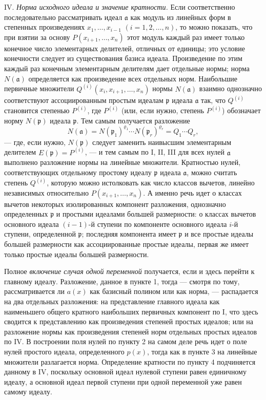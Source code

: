 \documentclass[11pt]{article}
\providecommand{\fraka}{\mathfrak a}
\providecommand{\frakp}{\mathfrak p}
\begin{document}
\noindent IV. \emph{Норма исходного идеала и значение кратности.} Если соответственно последовательно рассматривать идеал $\fraka$ как модуль из линейных форм в степенных произведениях $x_1,\ldots,x_{i-1}$ $(i=1,2,\ldots,n)$, то можно показать, что при взятии за основу $P(x_{i+1},\ldots,x_n)$ этот модуль каждый раз имеет только конечное число элементарных делителей, отличных от единицы; это условие конечности следует из существования базиса идеала. Произведение по этим каждый раз конечным элементарным делителям дает отдельные нормы; норма $N(\fraka)$ определяется как произведение всех отдельных норм. Наибольшие первичные множители $Q^{(i)}(x_i,x_{i+1},\ldots,x_n)$ нормы $N(\fraka)$ взаимно однозначно соответствуют ассоциированным простым идеалам $\frakp$ идеала $\fraka$ так, что $Q^{(i)}$ становится степенью $P^{(i)}$, где $P^{(i)}$ (или, если нужно, степень $P^{(i)}$) обозначает норму $N(\frakp)$ идеала $\frakp$. Тем самым получается разложение
\[
 N(\fraka)=N(\frakp_1)^{\varrho_1}\cdots N(\frakp_r)^{\varrho_r}=Q_1\cdots Q_r,
\]
--- где, если нужно, $N(\frakp)$ следует заменить наивысшим элементарным делителем $E(\frakp)=P^{(i)}$, --- и тем самым по I, II, III для всех нулей $\fraka$ выполнено разложение нормы на линейные множители. Кратностью нулей, соответствующих отдельному простому идеалу $\frakp$ идеала $\fraka$, можно считать степень $Q^{(i)}$, которую можно истолковать как число классов вычетов, линейно независимых относительно $P(x_{i+1},\ldots,x_n)$. А именно речь идет о классах вычетов некоторых изолированных компонент разложения, однозначно определенных $\frakp$ и простыми идеалами большей размерности: о классах вычетов основного идеала $(i-1)$-й ступени по компоненте основного идеала $i$-й ступени, определенной $\frakp$; последняя компонента имеет $\frakp$ и все простые идеалы большей размерности как ассоциированные простые идеалы, первая же имеет только простые идеалы большей размерности.

Полное \emph{включение случая одной переменной} получается, если и здесь перейти к главному идеалу. Разложение, данное в пункте 1, тогда --- смотря по тому, рассматривается ли $a(x)$ как базисный полином или как норма, --- распадается на два отдельных разложения: на представление главного идеала как наименьшего общего кратного наибольших первичных компонент по I, что здесь сводится к представлению как произведения степеней простых идеалов; или на разложение нормы как произведения степеней норм отдельных простых идеалов по IV. В построении поля нулей по пункту 2 на самом деле речь идет о поле нулей простого идеала, определенного $p(x)$, тогда как в пункте 3 на линейные множители разлагается норма. Определение кратности по пункту 4 подчиняется данному в IV, поскольку основной идеал нулевой ступени равен единичному идеалу, а основной идеал первой ступени при одной переменной уже равен самому идеалу.
\end{document}
